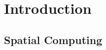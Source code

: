 \documentclass [11pt, proquest] {uwthesis}[2020/02/24]
\begin{document}
 
 
%
%

%
%

%
 
 
 
%
%

\textpages
 
 
\chapter {Introduction}

\section{Spatial Computing}
 
\end{document}
